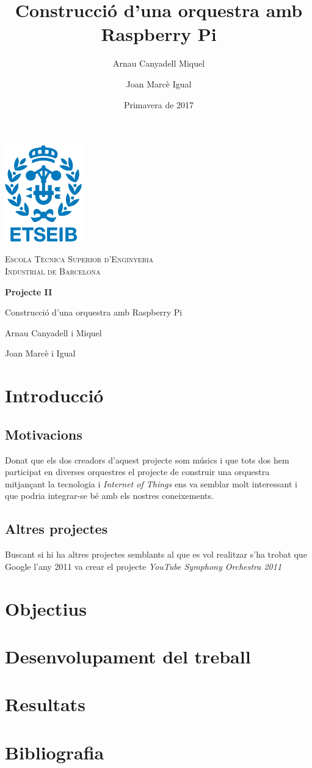 \documentclass[a4paper]{article}
\title{Construcció d'una orquestra amb Raspberry Pi}
\author{Arnau Canyadell Miquel \and Joan Marcè Igual}
\date{Primavera de 2017}
\begin{document}
\begin{titlepage}
	\centering
	\vspace{1cm}
	\includegraphics[width=0.25\textwidth]{images/etseib}
	\par\vspace{1cm}
	\textsc{ \LARGE Escola Tècnica Superior d'Enginyeria \\[1em] 
		Industrial de Barcelona}
	\par\vspace{2cm}
	\textbf{\Huge Projecte II}
	\par\vspace{2cm}
	{\LARGE Construcció d'una orquestra amb Raspberry Pi}
	\vfill
	\begin{flushright}
		\large
		Arnau Canyadell i Miquel \par
		Joan Marcè i Igual \par
	\end{flushright}
\end{titlepage}

\tableofcontents

\newpage

\section{Introducció}

\subsection{Motivacions}

Donat que els dos creadors d'aquest projecte som músics i que tots dos hem participat en diverses orquestres el projecte de construir una orquestra mitjançant la tecnologia i \emph{Internet of Things} ens va semblar molt interessant i que podria integrar-se bé amb els nostres coneixements.

\subsection{Altres projectes}

Buscant si hi ha altres projectes semblants al que es vol realitzar s'ha trobat que Google l'any 2011 va crear el projecte \emph{YouTube Symphony Orchestra 2011}

\section{Objectius}

\section{Desenvolupament del treball}

\section{Resultats}

\section{Bibliografia}
\end{document}
